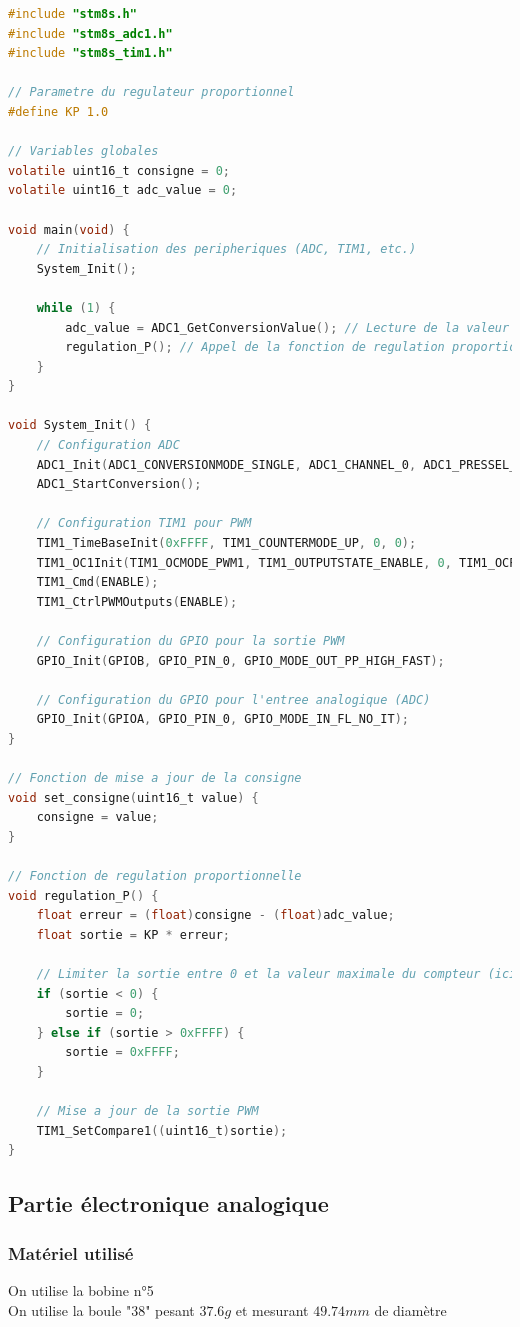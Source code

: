 \documentclass[11pt,a4paper]{article}
\begin{document}
\pagebreak
\begin{lstlisting}[language = C]
#include "stm8s.h"
#include "stm8s_adc1.h"
#include "stm8s_tim1.h"

// Parametre du regulateur proportionnel
#define KP 1.0

// Variables globales
volatile uint16_t consigne = 0;
volatile uint16_t adc_value = 0;

void main(void) {
    // Initialisation des peripheriques (ADC, TIM1, etc.)
    System_Init();

    while (1) {
        adc_value = ADC1_GetConversionValue(); // Lecture de la valeur ADC
        regulation_P(); // Appel de la fonction de regulation proportionnelle
    }
}

void System_Init() {
    // Configuration ADC
    ADC1_Init(ADC1_CONVERSIONMODE_SINGLE, ADC1_CHANNEL_0, ADC1_PRESSEL_FCPU_D2, ADC1_EXTTRIG_TIM, DISABLE, ADC1_ALIGN_RIGHT, ADC1_SCHMITTTRIG_CHANNEL0, DISABLE);
    ADC1_StartConversion();

    // Configuration TIM1 pour PWM
    TIM1_TimeBaseInit(0xFFFF, TIM1_COUNTERMODE_UP, 0, 0);
    TIM1_OC1Init(TIM1_OCMODE_PWM1, TIM1_OUTPUTSTATE_ENABLE, 0, TIM1_OCPOLARITY_HIGH);
    TIM1_Cmd(ENABLE);
    TIM1_CtrlPWMOutputs(ENABLE);

    // Configuration du GPIO pour la sortie PWM
    GPIO_Init(GPIOB, GPIO_PIN_0, GPIO_MODE_OUT_PP_HIGH_FAST);

    // Configuration du GPIO pour l'entree analogique (ADC)
    GPIO_Init(GPIOA, GPIO_PIN_0, GPIO_MODE_IN_FL_NO_IT);
}

// Fonction de mise a jour de la consigne
void set_consigne(uint16_t value) {
    consigne = value;
}

// Fonction de regulation proportionnelle
void regulation_P() {
    float erreur = (float)consigne - (float)adc_value;
    float sortie = KP * erreur;

    // Limiter la sortie entre 0 et la valeur maximale du compteur (ici 0xFFFF)
    if (sortie < 0) {
        sortie = 0;
    } else if (sortie > 0xFFFF) {
        sortie = 0xFFFF;
    }

    // Mise a jour de la sortie PWM
    TIM1_SetCompare1((uint16_t)sortie);
}
\end{lstlisting}

\subsection{Partie électronique analogique}
\subsubsection{Matériel utilisé}
On utilise la bobine n°5\\
On utilise la boule "38" pesant $37.6g$ et mesurant $49.74mm$ de diamètre
\end{document}
